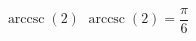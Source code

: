  {$\operatorname{arccsc} \left( 2 \right)$}
{ $\operatorname{arccsc} \left( 2 \right) = \dfrac{\pi}{6}$}

